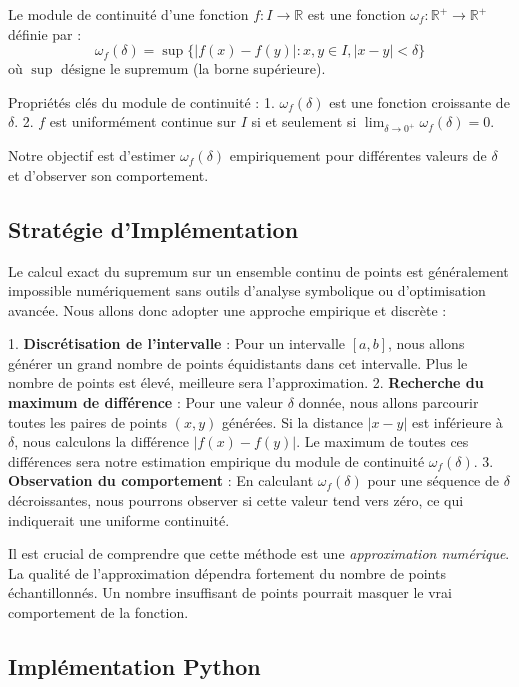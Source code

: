 \documentclass[12pt,a4paper]{report}
\begin{document}
Le module de continuité d'une fonction $f: I \to \mathbb{R}$ est une fonction $\omega_f: \mathbb{R}^+ \to \mathbb{R}^+$ définie par :
$$ \omega_f(\delta) = \sup \{ |f(x) - f(y)| : x, y \in I, |x - y| < \delta \} $$
où $\sup$ désigne le supremum (la borne supérieure).

Propriétés clés du module de continuité :
1.  $\omega_f(\delta)$ est une fonction croissante de $\delta$.
2.  $f$ est uniformément continue sur $I$ si et seulement si $\lim_{\delta \to 0^+} \omega_f(\delta) = 0$.

Notre objectif est d'estimer $\omega_f(\delta)$ empiriquement pour différentes valeurs de $\delta$ et d'observer son comportement.

\subsection{Stratégie d'Implémentation}

Le calcul exact du supremum sur un ensemble continu de points est généralement impossible numériquement sans outils d'analyse symbolique ou d'optimisation avancée. Nous allons donc adopter une approche empirique et discrète :

1.  \textbf{Discrétisation de l'intervalle} : Pour un intervalle $[a, b]$, nous allons générer un grand nombre de points équidistants dans cet intervalle. Plus le nombre de points est élevé, meilleure sera l'approximation.
2.  \textbf{Recherche du maximum de différence} : Pour une valeur $\delta$ donnée, nous allons parcourir toutes les paires de points $(x, y)$ générées. Si la distance $|x - y|$ est inférieure à $\delta$, nous calculons la différence $|f(x) - f(y)|$. Le maximum de toutes ces différences sera notre estimation empirique du module de continuité $\omega_f(\delta)$.
3.  \textbf{Observation du comportement} : En calculant $\omega_f(\delta)$ pour une séquence de $\delta$ décroissantes, nous pourrons observer si cette valeur tend vers zéro, ce qui indiquerait une uniforme continuité.

Il est crucial de comprendre que cette méthode est une \textit{approximation numérique}. La qualité de l'approximation dépendra fortement du nombre de points échantillonnés. Un nombre insuffisant de points pourrait masquer le vrai comportement de la fonction.

\subsection{Implémentation Python}
\end{document}
